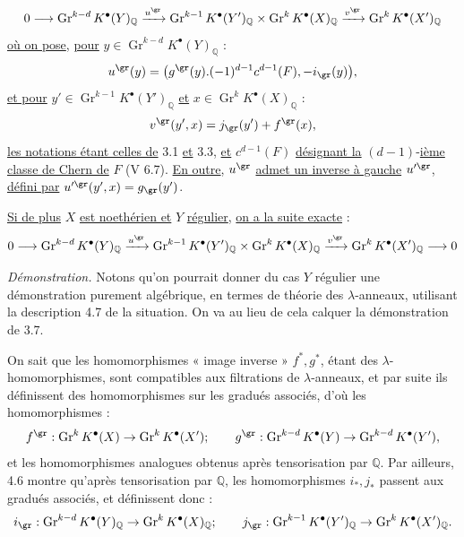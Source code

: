 
\[
0\longrightarrow
\operatorname{Gr}^{k-d}K^{\bullet}(Y)_{\mathbb Q}
\xrightarrow{u^{\gr}}
\operatorname{Gr}^{k-1}K^{\bullet}(Y')_{\mathbb Q}
\times
\operatorname{Gr}^{k}K^{\bullet}(X)_{\mathbb Q}
\xrightarrow{v^{\gr}}
\operatorname{Gr}^{k}K^{\bullet}(X')_{\mathbb Q}
\]
\uline{où on pose}, \uline{pour} \(y\in \operatorname{Gr}^{k-d}K^{\bullet}(Y)_{\mathbb Q}\) :
\[
  u^{\gr}(y)=
  \bigl(g^{\gr}(y).(-1)^{d-1}c^{d-1}(F),-i_{\gr}(y)\bigr),
\]
\uline{et pour} \(y'\in \operatorname{Gr}^{k-1}K^{\bullet}(Y')_{\mathbb Q}\) \uline{et} \(x\in \operatorname{Gr}^{k}K^{\bullet}(X)_{\mathbb Q}\) :
\[
  v^{\gr}(y',x)=j_{\gr}(y')+f^{\gr}(x),
\]
\uline{les notations étant celles de} 3.1 \uline{et} 3.3, \uline{et} \(c^{d-1}(F)\) \uline{désignant la} \((d-1)\)-\uline{ième classe de Chern de} \(F\) (V 6.7). \uline{En outre}, \(u^{\gr}\) \uline{admet un inverse à gauche} \(u'^{\gr}\), \uline{défini par} \(u'^{\gr}(y',x)=g_{\gr}(y')\).

\uline{Si de plus} \(X\) \uline{est noethérien et} \(Y\) \uline{régulier}, \uline{on a la suite exacte} :
\[
0\longrightarrow
\operatorname{Gr}^{k-d}K^{\bullet}(Y)_{\mathbb Q}
\xrightarrow{u^{\gr}}
\operatorname{Gr}^{k-1}K^{\bullet}(Y')_{\mathbb Q}
\times
\operatorname{Gr}^{k}K^{\bullet}(X)_{\mathbb Q}
\xrightarrow{v^{\gr}}
\operatorname{Gr}^{k}K^{\bullet}(X')_{\mathbb Q}
\longrightarrow0
\]

\emph{Démonstration.} Notons qu'on pourrait donner du cas \(Y\) régulier une démonstration purement algébrique, en termes de théorie des \(\lambda\)-anneaux, utilisant la description 4.7 de la situation. On va au lieu de cela calquer la démonstration de 3.7.

On sait que les homomorphismes « image inverse » \(f^*,g^*\), étant des \(\lambda\)-homomorphismes, sont compatibles aux filtrations de \(\lambda\)-anneaux, et par suite ils définissent des homomorphismes sur les gradués associés, d'où les homomorphismes :
\[
  f^{\gr}:\operatorname{Gr}^kK^{\bullet}(X)\to\operatorname{Gr}^kK^{\bullet}(X');
  \qquad
  g^{\gr}:\operatorname{Gr}^{k-d}K^{\bullet}(Y)\to\operatorname{Gr}^{k-d}K^{\bullet}(Y'),
\]
et les homomorphismes analogues obtenus après tensorisation par \(\mathbb Q\). Par ailleurs, 4.6 montre qu'après tensorisation par \(\mathbb Q\), les homomorphismes \(i_*,j_*\) passent aux gradués associés, et définissent
donc :
\[
  i_{\gr}:\operatorname{Gr}^{k-d}K^{\bullet}(Y)_{\mathbb Q}
  \to \operatorname{Gr}^{k}K^{\bullet}(X)_{\mathbb Q};
  \qquad
  j_{\gr}:\operatorname{Gr}^{k-1}K^{\bullet}(Y')_{\mathbb Q}
  \to \operatorname{Gr}^{k}K^{\bullet}(X')_{\mathbb Q}.
\]
